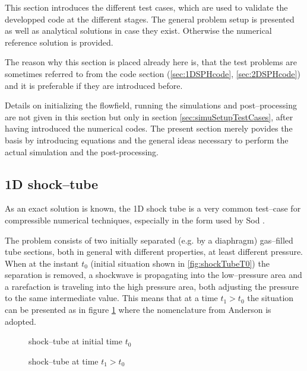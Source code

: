 \documentclass{report}
\begin{document}
This section introduces the different test cases, which are used to validate the developped code at the different stages. The general problem setup is presented as well as analytical solutions in case they exist. Otherwise the numerical reference solution is provided.

The reason why this section is placed already here is, that the test problems are sometimes referred to from the code section (\ref{sec:1DSPHcode}, \ref{sec:2DSPHcode}) and it is preferable if they are introduced before.

Details on initializing the flowfield, running the simulations and post--processing are not given in this section but only in section \ref{sec:simuSetupTestCases}, after having introduced the numerical codes. The present section merely povides the basis by introducing equations and the general ideas necessary to perform the actual simulation and the post-processing.

\subsection{1D shock--tube}
As an exact solution is known, the 1D shock tube is a very common test--case for compressible numerical techniques, especially in the form used by Sod \cite{Sod1978}.

 The problem consists of two initially separated (e.g. by a diaphragm) gas--filled tube sections, both in general with different properties, at least different pressure. When at the instant $t_0$ (initial situation shown in \ref{fig:shockTubeT0}) the separation is removed, a shockwave is propagating into the low--pressure area and a rarefaction is traveling into the high pressure area, both adjusting the pressure to the same intermediate value. This means that at a time $t_1>t_0$ the situation can be presented as in figure \ref{fig:shockTubeT1} where the nomenclature from Anderson \cite{Anderson2002} is adopted.

\begin{figure}[h]
    \centering
      
      \caption{shock--tube at initial time $t_0$}
      \label{fig:shockTubeT0}

      
      \caption{shock--tube at time $t_1>t_0$}
      \label{fig:shockTubeT1}
\end{figure}
\end{document}
